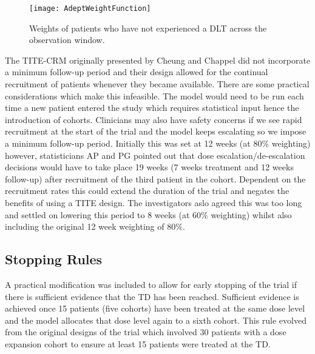 \begin{figure}[h!]
	\centering
	\caption[Weight function across the follow-up period.]{Weights of patients who have not experienced a DLT across the observation window.}
	\label{fig_adept:weight_function}
	\texttt{[image: AdeptWeightFunction]}
\end{figure}


The TITE-CRM originally presented by Cheung and Chappel \cite{cheungSequentialDesignsPhase2000} did not incorporate a minimum follow-up period and their design allowed for the continual recruitment of patients whenever they became available. There are some practical considerations which make this infeasible. The model would need to be run each time a new patient entered the study which requires statistical input hence the introduction of cohorts. Clinicians may also have safety concerns if we see rapid recruitment at the start of the trial and the model keeps escalating so we impose a minimum follow-up period. Initially this was set at 12 weeks (at 80\% weighting) however, statisticians AP and PG  pointed out that dose escalation/de-escalation decisions would have to take place 19 weeks (7 weeks treatment and 12 weeks follow-up) after recruitment of the third patient in the cohort. Dependent on the recruitment rates this could extend the duration of the trial and negates the benefits of using a TITE design. The investigators aslo agreed this was too long and settled on lowering this period to 8 weeks (at 60\% weighting) whilst also including the original 12 week weighting of 80\%.

%

\subsection{Stopping Rules}
\label{section2.3.3}%

A practical modification was included to allow for early stopping of the trial if there is sufficient evidence that the TD has been reached. Sufficient evidence is achieved once 15 patients (five cohorts) have been treated at the same dose level and the model allocates that dose level again to a sixth cohort. This rule evolved from the original designs of the trial which involved 30 patients with a dose expansion cohort to ensure at least 15 patients were treated at the TD. 

